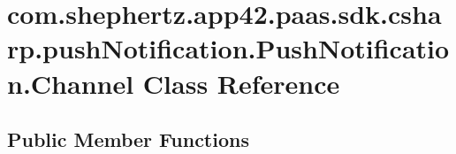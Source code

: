 \hypertarget{classcom_1_1shephertz_1_1app42_1_1paas_1_1sdk_1_1csharp_1_1push_notification_1_1_push_notification_1_1_channel}{\section{com.\+shephertz.\+app42.\+paas.\+sdk.\+csharp.\+push\+Notification.\+Push\+Notification.\+Channel Class Reference}
\label{classcom_1_1shephertz_1_1app42_1_1paas_1_1sdk_1_1csharp_1_1push_notification_1_1_push_notification_1_1_channel}
}
\subsection*{Public Member Functions}
